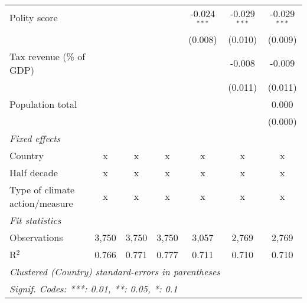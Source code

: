 \begin{tabular}{lcccccc}
   Polity score                                                       &                &               &               & -0.024$^{***}$ & -0.029$^{***}$ & -0.029$^{***}$\\   
                                                                      &                &               &               & (0.008)        & (0.010)        & (0.009)\\   
   Tax revenue (\% of GDP)                                            &                &               &               &                & -0.008         & -0.009\\   
                                                                      &                &               &               &                & (0.011)        & (0.011)\\   
   Population total                                                   &                &               &               &                &                & 0.000\\   
                                                                      &                &               &               &                &                & (0.000)\\   
   \emph{Fixed effects}\\
   Country                                                            & x              & x             & x             & x              & x              & x\\  
   Half decade                                                        & x              & x             & x             & x              & x              & x\\  
   Type of climate action/measure                                     & x              & x             & x             & x              & x              & x\\  
   \midrule \emph{Fit statistics}\\
   Observations                                                       & 3,750          & 3,750         & 3,750         & 3,057          & 2,769          & 2,769\\  
   R$^2$                                                              & 0.766          & 0.771         & 0.777         & 0.711          & 0.710          & 0.710\\  
   \midrule
   \multicolumn{7}{l}{\emph{Clustered (Country) standard-errors in parentheses}}\\
   \multicolumn{7}{l}{\emph{Signif. Codes: ***: 0.01, **: 0.05, *: 0.1}}\\
\end{tabular}
\par\endgroup


